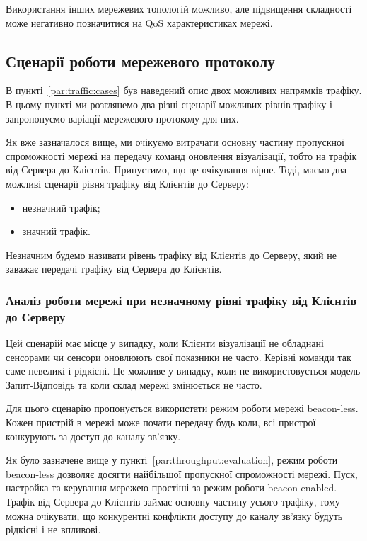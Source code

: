 \documentclass[a4paper,ukrainian,utf8,nocolumnsxix,nocolumnxxxii,nocolumnxxxi,floatsection,equationsection]{eskdtext}
\renewcommand\paragraph{\subsubsection}
\newcommand{\blm}[0]{beacon-less\xspace}
\newcommand{\bem}[0]{beacon-enabled\xspace}
\begin{document}
Використання інших мережевих топологій можливо, але підвищення складності може негативно позначитися на QoS характеристиках мережі.

\subsection{Сценарії роботи мережевого протоколу}
\label{sub:network:protocol:scenarios}

В пункті~\ref{par:traffic:cases} був наведений опис двох можливих напрямків трафіку. В цьому пункті ми розглянемо два різні сценарії можливих рівнів трафіку і запропонуємо варіації мережевого протоколу для них.

Як вже зазначалося вище, ми очікуємо витрачати основну частину пропускної спроможності мережі на передачу команд оновлення візуалізації, тобто на трафік від Сервера до Клієнтів. Припустимо, що це очікування вірне. Тоді, маємо два можливі сценарії рівня трафіку від Клієнтів до Серверу:
\begin{itemize}
	\item незначний трафік;
	\item значний трафік.
\end{itemize}

Незначним будемо називати рівень трафіку від Клієнтів до Серверу, який не заважає передачі трафіку від Сервера до Клієнтів.

\paragraph{Аналіз роботи мережі при незначному рівні трафіку від Клієнтів до Серверу}
\label{par:low:ntht}

Цей сценарій має місце у випадку, коли Клієнти візуалізації не обладнані сенсорами чи сенсори оновлюють свої показники не часто. Керівні команди так саме невеликі і рідкісні. Це можливе у випадку, коли не використовується модель Запит-Відповідь та коли склад мережі змінюється не часто.

Для цього сценарію пропонується використати режим роботи мережі \blm. Кожен пристрій в мережі може почати передачу будь коли, всі пристрої конкурують за доступ до каналу зв'язку. 

Як було зазначене вище у пункті~\ref{par:throughput:evaluation}, режим роботи \blm дозволяє досягти найбільшої пропускної спроможності мережі. Пуск, настройка та керування мережею простіші за режим роботи \bem. Трафік від Сервера до Клієнтів займає основну частину усього трафіку, тому можна очікувати, що конкурентні конфлікти доступу до каналу зв'язку будуть рідкісні і не впливові.
\end{document}

